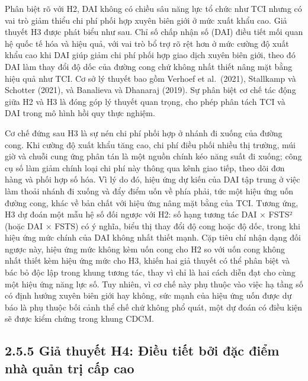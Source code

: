 \documentclass[
  a4paper,
  13pt]{extreport}
\begin{document}
Phân biệt rõ với H2, DAI không có chiều sâu năng lực tổ chức như TCI
nhưng có vai trò giảm thiểu chi phí phối hợp xuyên biên giới ở mức xuất
khẩu cao. Giả thuyết H3 được phát biểu như sau. Chỉ số chấp nhận số
(DAI) điều tiết mối quan hệ quốc tế hóa và hiệu quả, với vai trò bổ trợ
rõ rệt hơn ở mức cường độ xuất khẩu cao khi DAI giúp giảm chi phí phối
hợp giao dịch xuyên biên giới, theo đó DAI làm thay đổi độ dốc của đường
cong chứ không nhất thiết nâng mặt bằng hiệu quả như TCI. Cơ sở lý
thuyết bao gồm Verhoef et al.~(2021), Stallkamp và Schotter (2021), và
Banalieva và Dhanaraj (2019). Sự phân biệt cơ chế tác động giữa H2 và H3
là đóng góp lý thuyết quan trọng, cho phép phân tách TCI và DAI trong mô
hình hồi quy thực nghiệm.

Cơ chế đứng sau H3 là sự nén chi phí phối hợp ở nhánh đi xuống của đường
cong. Khi cường độ xuất khẩu tăng cao, chi phí điều phối nhiều thị
trường, múi giờ và chuỗi cung ứng phân tán là một nguồn chính kéo năng
suất đi xuống; công cụ số làm giảm chính loại chi phí này thông qua kênh
giao tiếp, theo dõi đơn hàng và phối hợp số hóa. Vì lý do đó, hiệu ứng
dự kiến của DAI tập trung ở việc làm thoải nhánh đi xuống và đẩy điểm
uốn về phía phải, tức một hiệu ứng uốn đường cong, khác về bản chất với
hiệu ứng nâng mặt bằng của TCI. Tương ứng, H3 dự đoán một mẫu hệ số đối
ngược với H2: số hạng tương tác DAI × FSTS² (hoặc DAI × FSTS) có ý
nghĩa, biểu thị thay đổi độ cong hoặc độ dốc, trong khi hiệu ứng mức
chính của DAI không nhất thiết mạnh. Cặp tiêu chí nhận dạng đối ngược
này, hiệu ứng mức không kèm uốn cong cho H2 so với uốn cong không nhất
thiết kèm hiệu ứng mức cho H3, khiến hai giả thuyết có thể phân biệt và
bác bỏ độc lập trong khung tương tác, thay vì chỉ là hai cách diễn đạt
cho cùng một hiệu ứng năng lực số. Tuy nhiên, vì cơ chế này phụ thuộc
vào việc hạ tầng số có định hướng xuyên biên giới hay không, sức mạnh
của hiệu ứng uốn được dự báo là phụ thuộc bối cảnh thể chế chứ không phổ
quát, một dự đoán có điều kiện sẽ được kiểm chứng trong khung CDCM.

\hypertarget{giux1ea3-thuyux1ebft-h4-ux111iux1ec1u-tiux1ebft-bux1edfi-ux111ux1eb7c-ux111iux1ec3m-nhuxe0-quux1ea3n-trux1ecb-cux1ea5p-cao}{%
\subsection{2.5.5 Giả thuyết H4: Điều tiết bởi đặc điểm nhà quản trị cấp
cao}\label{giux1ea3-thuyux1ebft-h4-ux111iux1ec1u-tiux1ebft-bux1edfi-ux111ux1eb7c-ux111iux1ec3m-nhuxe0-quux1ea3n-trux1ecb-cux1ea5p-cao}}
\end{document}

